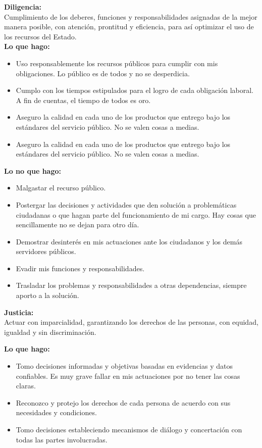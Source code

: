 \textbf{Diligencia: } \\
Cumplimiento de los deberes, funciones y responsabilidades asignadas de la mejor manera posible, con atención, prontitud y eficiencia, para así optimizar el uso de los recursos del Estado. \\

\textbf{Lo que hago: }
\begin{itemize}
	\item Uso responsablemente los recursos públicos para cumplir con mis obligaciones. Lo público es de todos y no se desperdicia. 
	\item Cumplo con los tiempos estipulados para el logro de cada obligación laboral. A fin de cuentas, el tiempo de todos es oro. 
	\item Aseguro la calidad en cada uno de los productos que entrego bajo los estándares del servicio público. No se valen cosas a medias. 
	\item Aseguro la calidad en cada uno de los productos que entrego bajo los estándares del servicio público. No se valen cosas a medias. 
\end{itemize}

\textbf{Lo no que hago: }
\begin{itemize}
	\item Malgastar el recurso público. 
	\item Postergar las decisiones y actividades que den solución a problemáticas ciudadanas o que hagan parte del funcionamiento de mi cargo. Hay cosas que sencillamente no se dejan para otro día. 
	\item Demostrar desinterés en mis actuaciones ante los ciudadanos y los demás servidores públicos. 
	\item Evadir mis funciones y responsabilidades. 
	\item Trasladar los problemas y responsabilidades a otras dependencias, siempre aporto a la solución.
\end{itemize}


\textbf{Justicia: } \\
Actuar con imparcialidad, garantizando los derechos de las personas, con equidad, igualdad y sin discriminación. 

\textbf{Lo que hago: }
\begin{itemize}
	\item Tomo decisiones informadas y objetivas basadas en evidencias y datos confiables. Es muy grave fallar en mis actuaciones por no tener las cosas claras. 
	\item Reconozco y protejo los derechos de cada persona de acuerdo con sus necesidades y condiciones. 
	\item Tomo decisiones estableciendo mecanismos de diálogo y concertación con todas las partes involucradas.  
\end{itemize}

